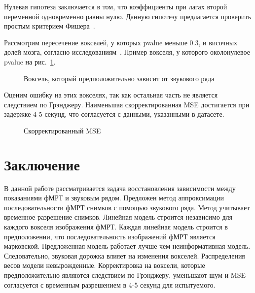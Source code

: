 \documentclass[12pt, twoside]{article}
\begin{document}
Нулевая гипотеза заключается в том, что коэффициенты при лагах второй переменной одновременно равны нулю. Данную гипотезу предлагается проверить простым критерием Фишера~\citep{hetero}.

Рассмотрим пересечение вокселей, у которых pvalue меньше 0.3, и височных долей мозга, согласно исследованиям~\citep{brain}. Пример вокселя, у которого околонулевое pvalue на рис.~\ref{fig:voxel}.

\begin{figure}[h!]
	\caption{Воксель, который предположительно зависит от звукового ряда}
	\label{fig:voxel}
\end{figure}


Оценим ошибку на этих вокселях, так как остальная часть не является следствием по Грэнджеру. Наименьшая скорректированная MSE достигается при задержке 4-5 секунд, что согласуется с данными, указанными в датасете.

\begin{figure}[h!]
	\caption{Скорректированный MSE}
	\label{fig:loc}
\end{figure}

\section{Заключение}
В данной работе рассматривается задача восстановления зависимости между показаниями фМРТ и звуковым рядом. Предложен метод аппроксимации последовательности фМРТ снимков с помощью звукового ряда. Метод учитывает временное разрешение снимков. Линейная модель строится независимо для каждого вокселя изображения фМРТ. Каждая линейная модель строится в предположении, что последовательность изображений фМРТ является марковской. Предложенная модель работает лучше чем неинформативная модель. Следовательно, звуковая дорожка влияет на изменения вокселей. Распределения весов модели невырожденные. Корректировка на воксели, которые предположительно являются следствием по Грэнджеру, уменьшают шум и MSE согласуется с временным разрешением в 4-5 секунд для испытуемого.
\renewcommand{\refname}{Литература}
\makeatletter
\renewcommand{\bibsection}{%
   \section{\refname%
            \@mkboth{\MakeUppercase{\refname}}{\MakeUppercase{\refname}}%
   }
}


\end{document}
